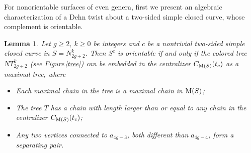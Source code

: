 \documentclass[11 pt]{amsart}
\newtheorem{Lemma}[Theorem]{Lemma}
\theoremstyle{definition}
\begin{document}
For nonorientable surfaces of even genera, first we present an
algebraic characterization of a Dehn twist about a two-sided simple
closed curve, whose complement is orientable.

\begin{Lemma}\label{Lem-compOrien}
Let $g\geq 2, \ k\geq 0$ be integers and $c$ be a nontrivial
two-sided simple closed curve in $S=N_{2g+2}^k$. Then $S^c$ is
orientable if and only if the colored tree $NT_{2g+2}^k$ (see
Figure\,\ref{tree}) can be embedded in the centralizer $C_{{\rm
M}(S)}(t_c)$ as a maximal tree, where
\begin{itemize}
\item[1)] Each maximal chain in the tree is a maximal chain in ${\rm M}(S)$;

\item[2)] The tree $T$ has a chain with length larger than or equal to any
chain in the centralizer $C_{{\rm M}(S)}(t_c)$;

\item[3)] Any two vertices connected to $a_{4g-3}$, both different than
$a_{4g-4}$, form a separating pair.
\end{itemize}

\end{Lemma}
\end{document}
